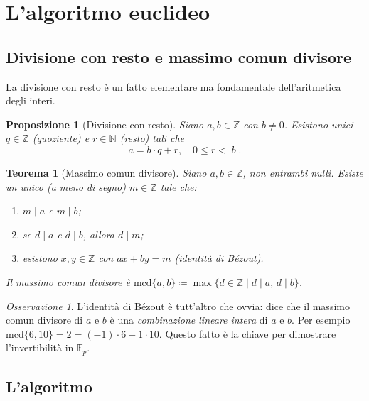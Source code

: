 \documentclass[11pt, a4paper]{book}
\theoremstyle{definition}
\theoremstyle{plain}
\newtheorem{teorema}[definizione]{Teorema}
\newtheorem{proposizione}[definizione]{Proposizione}
\theoremstyle{remark}
\newtheorem{osservazione}[definizione]{Osservazione}
\newcommand{\N}{\mathbb{N}}
\newcommand{\Z}{\mathbb{Z}}
\newcommand{\mcd}{\mathrm{mcd}}
\begin{document}
\section{L'algoritmo euclideo}

\subsection{Divisione con resto e massimo comun divisore}

La divisione con resto è un fatto elementare ma fondamentale dell'aritmetica degli interi.

\begin{proposizione}[Divisione con resto]
Siano $a, b \in \Z$ con $b \neq 0$. Esistono unici $q \in \Z$ (quoziente) e $r \in \N$ (resto) tali che
\[
  a = b \cdot q + r, \quad 0 \leq r < |b|.
\]
\end{proposizione}

\begin{defbox}
\begin{teorema}[Massimo comun divisore]
Siano $a, b \in \Z$, non entrambi nulli. Esiste un unico (a meno di segno) $m \in \Z$ tale che:
\begin{enumerate}
  \item $m \mid a$ e $m \mid b$;
  \item se $d \mid a$ e $d \mid b$, allora $d \mid m$;
  \item esistono $x, y \in \Z$ con $ax + by = m$ \emph{(identità di Bézout)}.
\end{enumerate}
Il \emph{massimo comun divisore} è $\mcd\{a,b\} \coloneqq \max\{d \in \Z \mid d \mid a,\, d \mid b\}$.
\end{teorema}
\end{defbox}

\begin{osservazione}
L'identità di Bézout è tutt'altro che ovvia: dice che il massimo comun divisore di $a$ e $b$ è una \emph{combinazione lineare intera} di $a$ e $b$. Per esempio $\mcd\{6, 10\} = 2 = (-1) \cdot 6 + 1 \cdot 10$. Questo fatto è la chiave per dimostrare l'invertibilità in $\mathbb{F}_p$.
\end{osservazione}

\subsection{L'algoritmo}
\end{document}

